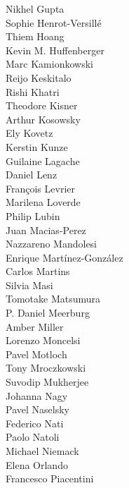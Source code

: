 \documentclass[PICOReport.tex]{subfiles}
\begin{document}
{\begin{multicols}{4}
Nikhel Gupta                    \\
Sophie Henrot-Versill\'e        \\
Thiem Hoang                     \\
Kevin M. Huffenberger           \\
Marc Kamionkowski               \\
Reijo Keskitalo                 \\
Rishi Khatri                    \\
Theodore Kisner                 \\
Arthur Kosowsky                 \\
Ely Kovetz                      \\
Kerstin Kunze                   \\
Guilaine Lagache                \\
Daniel Lenz                     \\
Fran\c{c}ois Levrier            \\
Marilena Loverde                \\
Philip Lubin                    \\
Juan Macias-Perez               \\
Nazzareno Mandolesi             \\
Enrique Mart\'{i}nez-Gonz\'{a}lez   \\
Carlos Martins                  \\
Silvia Masi                     \\
Tomotake Matsumura              \\
P. Daniel Meerburg              \\
Amber Miller                    \\
Lorenzo Moncelsi                \\
Pavel Motloch                   \\
Tony Mroczkowski                \\
Suvodip Mukherjee               \\
Johanna Nagy                    \\
Pavel Naselsky                  \\
Federico Nati                   \\
Paolo Natoli                    \\
Michael Niemack                 \\
Elena Orlando                   \\
Francesco Piacentini            \\

\end{multicols}}
\end{document}
